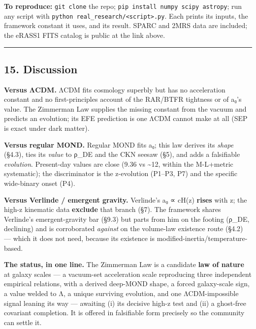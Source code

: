 \documentclass[
]{article}
\begin{document}
\textbf{To reproduce:} \texttt{git\ clone} the repo;
\texttt{pip\ install\ numpy\ scipy\ astropy}; run any script with
\texttt{python\ real\_research/\textless{}script\textgreater{}.py}. Each
prints its inputs, the framework constant it uses, and its result. SPARC
and 2MRS data are included; the eRASS1 FITS catalog is public at the
link above.

\begin{center}\rule{0.5\linewidth}{0.5pt}\end{center}

\subsection{15. Discussion}\label{discussion}

\textbf{Versus ΛCDM.} ΛCDM fits cosmology superbly but has no
acceleration constant and no first-principles account of the RAR/BTFR
tightness or of a₀'s value. The Zimmerman Law supplies the missing
constant from the vacuum and predicts an evolution; its EFE prediction
is one ΛCDM cannot make at all (SEP is exact under dark matter).

\textbf{Versus regular MOND.} Regular MOND fits a₀; this law derives its
\emph{shape} (§4.3), ties its \emph{value} to ρ\_DE and the CKN seesaw
(§5), and adds a falsifiable \emph{evolution}. Present-day values are
close (9.36 vs \textasciitilde12, within the M-L+metric systematic); the
discriminator is the z-evolution (P1--P3, P7) and the specific
wide-binary onset (P4).

\textbf{Versus Verlinde / emergent gravity.} Verlinde's a₀ ∝ cH(z)
\textbf{rises} with z; the high-z kinematic data \textbf{exclude} that
branch (§7). The framework shares Verlinde's emergent-gravity bar (§9.3)
but parts from him on the footing (ρ\_DE, declining) and is corroborated
\emph{against} on the volume-law existence route (§4.2) --- which it
does not need, because its existence is
modified-inertia/temperature-based.

\textbf{The status, in one line.} The Zimmerman Law is a candidate
\textbf{law of nature} at galaxy scales --- a vacuum-set acceleration
scale reproducing three independent empirical relations, with a derived
deep-MOND shape, a forced galaxy-scale sign, a value welded to Λ, a
unique surviving evolution, and one ΛCDM-impossible signal leaning its
way --- awaiting (i) its decisive high-z test and (ii) a ghost-free
covariant completion. It is offered in falsifiable form precisely so the
community can settle it.
\end{document}
